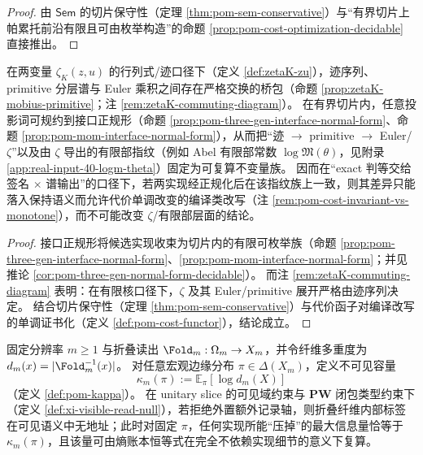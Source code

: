 \begin{proof}
由 \(\mathsf{Sem}\) 的切片保守性（定理 \ref{thm:pom-sem-conservative}）与“有界切片上帕累托前沿有限且可由枚举构造”的命题 \ref{prop:pom-cost-optimization-decidable} 直接推出。
\end{proof}

\begin{theorem}\label{thm:xi-zeta-interface-auditable-uniqueness}
在两变量 \(\zeta_K(z,u)\) 的行列式/迹口径下（定义 \ref{def:zetaK-zu}），迹序列、primitive 分层谱与 Euler 乘积之间存在严格交换的桥包（命题 \ref{prop:zetaK-mobius-primitive}；注 \ref{rem:zetaK-commuting-diagram}）。
在有界切片内，任意投影词可规约到接口正规形（命题 \ref{prop:pom-three-gen-interface-normal-form}、命题 \ref{prop:pom-mom-interface-normal-form}），从而把“迹 \(\to\) primitive \(\to\) Euler/\(\zeta\)”以及由 \(\zeta\) 导出的有限部指纹（例如 Abel 有限部常数 \(\log\mathfrak{M}(\theta)\)，见附录 \ref{app:real-input-40-logm-theta}）固定为可复算不变量族。
因而在“exact 判等交给签名 \(\times\) 谱输出”的口径下，若两实现经正规化后在该指纹族上一致，则其差异只能落入保持语义而允许代价单调改变的编译类改写（注 \ref{rem:pom-cost-invariant-vs-monotone}），而不可能改变 \(\zeta\)/有限部层面的结论。
\end{theorem}

\begin{proof}
接口正规形将候选实现收束为切片内的有限可枚举族（命题 \ref{prop:pom-three-gen-interface-normal-form}、\ref{prop:pom-mom-interface-normal-form}；并见推论 \ref{cor:pom-three-gen-normal-form-decidable}）。
而注 \ref{rem:zetaK-commuting-diagram} 表明：在有限核口径下，\(\zeta\) 及其 Euler/primitive 展开严格由迹序列决定。
结合切片保守性（定理 \ref{thm:pom-sem-conservative}）与代价函子对编译改写的单调证书化（定义 \ref{def:pom-cost-functor}），结论成立。
\end{proof}

\begin{theorem}\label{thm:xi-kappa-unique-carrier}
固定分辨率 \(m\ge 1\) 与折叠读出 \(\Fold_m:\Omega_m\to X_m\)，并令纤维多重度为 \(d_m(x)=|\Fold_m^{-1}(x)|\)。
对任意宏观边缘分布 \(\pi\in\Delta(X_m)\)，定义不可见容量
\[
\kappa_m(\pi):=\mathbb{E}_{\pi}[\log d_m(X)]
\]
（定义 \ref{def:pom-kappa}）。
在 unitary slice 的可见域约束与 \(\mathbf{PW}\) 闭包类型约束下（定义 \ref{def:xi-visible-read-null}），若拒绝外置额外记录轴，则折叠纤维内部标签在可见语义中无地址；此时对固定 \(\pi\)，任何实现所能“压掉”的最大信息量恰等于 \(\kappa_m(\pi)\)，且该量可由熵账本恒等式在完全不依赖实现细节的意义下复算。
\end{theorem}


